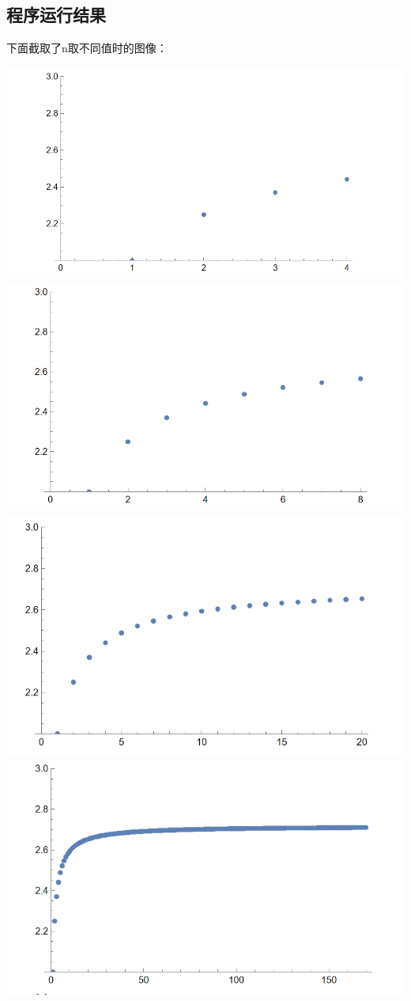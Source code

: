 \documentclass{ctexart}
\begin{document}
\subsection{程序运行结果}
下面截取了n取不同值时的图像：
\begin{center}
\includegraphics[scale=0.5]{6.png}
\includegraphics[scale=0.5]{7.png}
\includegraphics[scale=0.5]{8.png}
\includegraphics[scale=0.5]{9.png}

\end{center}
\end{document}
